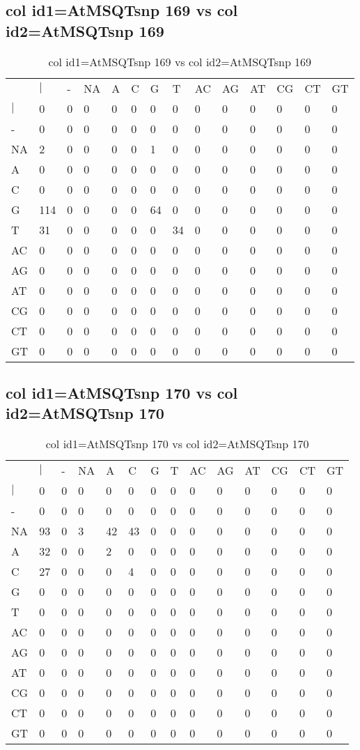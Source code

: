 \subsection{col id1=AtMSQTsnp 169 vs col id2=AtMSQTsnp 169}
\begin{center}
\begin{longtable}{|l|l|l|l|l|l|l|l|l|l|l|l|l|l|}
\caption{col id1=AtMSQTsnp 169 vs col id2=AtMSQTsnp 169} \label{table_dm548}\\
\hline
\\
\hline
&$|$&-&NA&A&C&G&T&AC&AG&AT&CG&CT&GT\\
$|$&0&0&0&0&0&0&0&0&0&0&0&0&0\\
-&0&0&0&0&0&0&0&0&0&0&0&0&0\\
NA&2&0&0&0&0&1&0&0&0&0&0&0&0\\
A&0&0&0&0&0&0&0&0&0&0&0&0&0\\
C&0&0&0&0&0&0&0&0&0&0&0&0&0\\
G&114&0&0&0&0&64&0&0&0&0&0&0&0\\
T&31&0&0&0&0&0&34&0&0&0&0&0&0\\
AC&0&0&0&0&0&0&0&0&0&0&0&0&0\\
AG&0&0&0&0&0&0&0&0&0&0&0&0&0\\
AT&0&0&0&0&0&0&0&0&0&0&0&0&0\\
CG&0&0&0&0&0&0&0&0&0&0&0&0&0\\
CT&0&0&0&0&0&0&0&0&0&0&0&0&0\\
GT&0&0&0&0&0&0&0&0&0&0&0&0&0\\
\hline
\end{longtable}
\end{center}

\subsection{col id1=AtMSQTsnp 170 vs col id2=AtMSQTsnp 170}
\begin{center}
\begin{longtable}{|l|l|l|l|l|l|l|l|l|l|l|l|l|l|}
\caption{col id1=AtMSQTsnp 170 vs col id2=AtMSQTsnp 170} \label{table_dm550}\\
\hline
\\
\hline
&$|$&-&NA&A&C&G&T&AC&AG&AT&CG&CT&GT\\
$|$&0&0&0&0&0&0&0&0&0&0&0&0&0\\
-&0&0&0&0&0&0&0&0&0&0&0&0&0\\
NA&93&0&3&42&43&0&0&0&0&0&0&0&0\\
A&32&0&0&2&0&0&0&0&0&0&0&0&0\\
C&27&0&0&0&4&0&0&0&0&0&0&0&0\\
G&0&0&0&0&0&0&0&0&0&0&0&0&0\\
T&0&0&0&0&0&0&0&0&0&0&0&0&0\\
AC&0&0&0&0&0&0&0&0&0&0&0&0&0\\
AG&0&0&0&0&0&0&0&0&0&0&0&0&0\\
AT&0&0&0&0&0&0&0&0&0&0&0&0&0\\
CG&0&0&0&0&0&0&0&0&0&0&0&0&0\\
CT&0&0&0&0&0&0&0&0&0&0&0&0&0\\
GT&0&0&0&0&0&0&0&0&0&0&0&0&0\\
\hline
\end{longtable}
\end{center}

